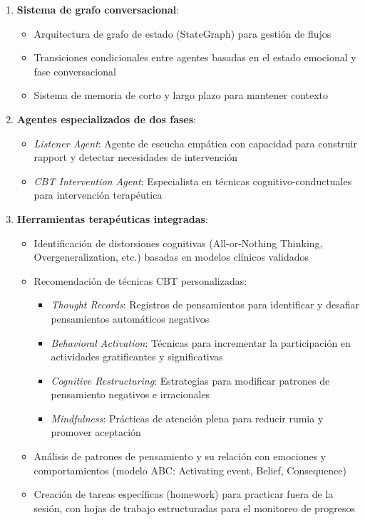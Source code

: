 \documentclass[conference]{IEEEtran}
\begin{document}
\begin{enumerate}
\item \textbf{Sistema de grafo conversacional}:
    \begin{itemize}
    \item Arquitectura de grafo de estado (StateGraph) para gestión de flujos
    \item Transiciones condicionales entre agentes basadas en el estado emocional y fase conversacional
    \item Sistema de memoria de corto y largo plazo para mantener contexto
    \end{itemize}

\item \textbf{Agentes especializados de dos fases}:
    \begin{itemize}
    \item \textit{Listener Agent}: Agente de escucha empática con capacidad para construir rapport y detectar necesidades de intervención
    \item \textit{CBT Intervention Agent}: Especialista en técnicas cognitivo-conductuales para intervención terapéutica
    \end{itemize}

\item \textbf{Herramientas terapéuticas integradas}:
    \begin{itemize}
    \item Identificación de distorsiones cognitivas (All-or-Nothing Thinking, Overgeneralization, etc.) basadas en modelos clínicos validados \cite{b17}
    \item Recomendación de técnicas CBT personalizadas:
        \begin{itemize}
        \item \textit{Thought Records}: Registros de pensamientos para identificar y desafiar pensamientos automáticos negativos \cite{b17}
        \item \textit{Behavioral Activation}: Técnicas para incrementar la participación en actividades gratificantes y significativas \cite{b17}
        \item \textit{Cognitive Restructuring}: Estrategias para modificar patrones de pensamiento negativos e irracionales \cite{b17}
        \item \textit{Mindfulness}: Prácticas de atención plena para reducir rumia y promover aceptación \cite{b17}
        \end{itemize}
    \item Análisis de patrones de pensamiento y su relación con emociones y comportamientos (modelo ABC: Activating event, Belief, Consequence) \cite{b17}
    \item Creación de tareas específicas (homework) para practicar fuera de la sesión, con hojas de trabajo estructuradas para el monitoreo de progresos \cite{b17}
    \end{itemize}


\end{enumerate}
\end{document}
